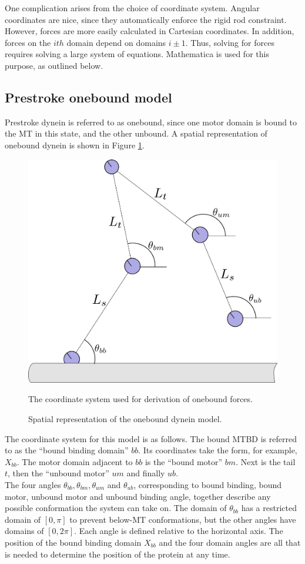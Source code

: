 \documentclass[
11pt, %
english, %
singlespacing, %
headsepline, %
chapterinoneline, %
]{MastersDoctoralThesis} %
\begin{document}
One complication arises from the choice of coordinate system. Angular coordinates are nice, since they automatically enforce the rigid rod constraint. However, forces are more easily calculated in Cartesian coordinates. In addition, forces on the $ith$ domain depend on domains $i\pm1$. Thus, solving for forces requires solving a large system of equations. Mathematica is used for this purpose, as outlined below.\\

\subsection{Prestroke onebound model}
Prestroke dynein is referred to as onebound, since one motor domain is bound to the MT in this state, and the other unbound. A spatial representation of onebound dynein is shown in Figure \ref{fig:derivation-onebound}.

\begin{figure}[h]
  \centering
  \includegraphics[width=.45\textwidth]{../../figures/derivation-onebound}
  \caption{Spatial representation of the onebound dynein model.}{The coordinate system used for derivation of onebound forces.}
  \label{fig:derivation-onebound}
\end{figure}

The coordinate system for this model is as follows. The bound MTBD is referred to as the ``bound binding domain'' $bb$. Its coordinates take the form, for example, $X_{bb}$. The motor domain adjacent to $bb$ is the ``bound motor'' $bm$. Next is the tail $t$, then the ``unbound motor'' $um$ and finally $ub$.\\

The four angles $\theta_{bb}, \theta_{bm}, \theta_{um}$ and $\theta_{ub}$, corresponding to bound binding, bound motor, unbound motor and unbound binding angle, together describe any possible conformation the system can take on. The domain of $\theta_{bb}$ has a restricted domain of $[0,\pi]$ to prevent below-MT conformations, but the other angles have domains of $[0,2\pi]$. Each angle is defined relative to the horizontal axis. The position of the bound binding domain $X_{bb}$ and the four domain angles are all that is needed to determine the position of the protein at any time.\\
\end{document}

